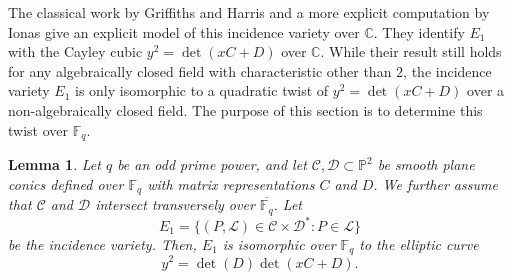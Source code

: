 \documentclass[11pt]{article}
\newtheorem{lem}[defn]{Lemma}  %
\theoremstyle{definition}
\theoremstyle{definition}
\begin{document}
The classical work by Griffiths and Harris \cite{GH} and a more explicit computation by Ionas \cite{Ionas} give an explicit model of this incidence variety over $\mathbb{C}$. They identify $E_1$ with the Cayley cubic $y^2 = \det(xC+D)$ over $\mathbb{C}$. While their result still holds for any algebraically closed field with characteristic other than $2$, the incidence variety $E_1$ is only isomorphic to a quadratic twist of $y^2 = \det(xC+D)$ over a non-algebraically closed field. The purpose of this section is to determine this twist over $\mathbb F_q$.

\begin{lem}\label{lem:incidence-cayley-twist}
Let $q$ be an odd prime power, and let $\mathcal C,\mathcal D\subset \mathbb P^2$ be smooth plane conics defined over $\mathbb{F}_q$ with matrix representations $C$ and $D$. We further assume that $\mathcal C$ and $\mathcal D$ intersect transversely over $\overline{\mathbb{F}_q}$. Let
$$E_1 =\{(P, \mathcal L)\in \mathcal C\times \mathcal D^*:P\in \mathcal L\}$$
be the incidence variety. Then, $E_1$ is isomorphic over $\mathbb{F}_q$ to the elliptic curve 
$$y^2 = \det(D)\det(xC+D).$$

\end{lem}
\end{document}
